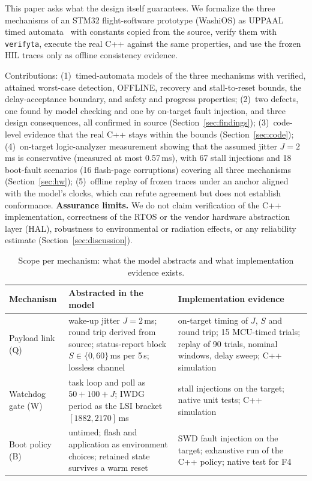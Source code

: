 \documentclass[conference,a4paper]{IEEEtran}
\newif\ifanon
\begin{document}
This paper asks what the design itself guarantees. We formalize the three mechanisms of an STM32 flight-software prototype (\ifanon name withheld for review; firmware not yet released\else WashiOS\fi) as UPPAAL timed automata~\cite{alur1994,larsen1997,behrmann2004} with constants copied from the source, verify them with \texttt{verifyta}, execute the real C++ against the same properties, and use the frozen HIL traces only as offline consistency evidence.

Contributions: (1)~timed-automata models of the three mechanisms with verified, attained worst-case detection, OFFLINE, recovery and stall-to-reset bounds, the delay-acceptance boundary, and safety and progress properties; (2)~two defects, one found by model checking and one by on-target fault injection, and three design consequences, all confirmed in source (Section~\ref{sec:findings}); (3)~code-level evidence that the real C++ stays within the bounds (Section~\ref{sec:code}); (4)~on-target logic-analyzer measurement showing that the assumed jitter $J{=}2$\,ms is conservative (measured at most 0.57\,ms), with 67 stall injections and 18 boot-fault scenarios (16 flash-page corruptions) covering all three mechanisms (Section~\ref{sec:hw}); (5)~offline replay of frozen traces under an anchor aligned with the model's clocks, which can refute agreement but does not establish conformance.
\textbf{Assurance limits.} We do not claim verification of the C++ implementation, correctness of the RTOS or the vendor hardware abstraction layer (HAL), robustness to environmental or radiation effects, or any reliability estimate (Section~\ref{sec:discussion}).

\begin{table}[t]
\centering\footnotesize
\caption{Scope per mechanism: what the model abstracts and what implementation evidence exists.}
\label{tab:scope}
\setlength{\tabcolsep}{3.5pt}
\begin{tabularx}{\columnwidth}{@{}>{\raggedright\arraybackslash}p{1.32cm} >{\raggedright\arraybackslash}X >{\raggedright\arraybackslash}X@{}}
\toprule
Mechanism & Abstracted in the model & Implementation evidence \\
\midrule
Payload link (Q) & wake-up jitter $J{=}2$\,ms; round trip derived from source; status-report block $S\in\{0,60\}$\,ms per 5\,s; lossless channel & on-target timing of $J$, $S$ and round trip; 15 MCU-timed trials; replay of 90 trials, nominal windows, delay sweep; C++ simulation \\
\midrule
Watchdog gate (W) & task loop and poll as $50{+}100{+}J$; IWDG period as the LSI bracket $[1882,2170]$\,ms & 67 stall injections on the target; native unit tests; C++ simulation \\
\midrule
Boot policy (B) & untimed; flash and application as environment choices; retained state survives a warm reset & SWD fault injection on the target; exhaustive run of the C++ policy; native test for F4 \\
\bottomrule
\end{tabularx}
\end{table}
\end{document}
